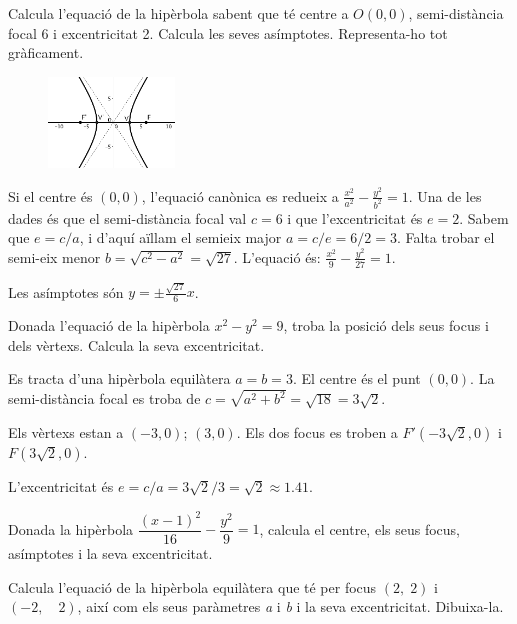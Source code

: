 \begin{resolt}[E]{Calcula l'equació de la hipèrbola sabent que té centre a $O(0,0)$, semi-distància focal 6 i excentricitat 2. Calcula les seves asímptotes. Representa-ho tot gràficament.}
  	\begin{figure} 
		\vspace{-0.5cm}
		\begin{center}
			\includegraphics[width=0.3\textwidth]{img-10/exem-h2.png}
		\end{center}
	\end{figure}

	Si el centre és $(0,0)$, l'equació canònica es redueix a \linebreak $\frac{x^2}{a^2}-\frac{y^2}{b^2}=1$. Una de les dades és que el semi-distància focal val $c=6$ i que l'excentricitat és $e=2$. Sabem que $e=c/a$, i d'aquí aïllam el semieix major  $a=c/e=6/2=3$. Falta trobar el semi-eix menor $b=\sqrt{c^2-a^2}=\sqrt{27}$. L'equació és: $\frac{x^2}{9}-\frac{y^2}{27}=1$.
	
	Les asímptotes són $y=\pm \frac{\sqrt{27}}{6}x$.
\end{resolt}
\begin{resolt}{ Donada l'equació de la hipèrbola  $x^2-y^2=9$, troba la posició dels seus focus i dels vèrtexs. Calcula la seva excentricitat. }
  
	Es tracta d'una hipèrbola equilàtera $a=b=3$. El centre és el punt $(0,0)$. La semi-distància focal es troba de $c=\sqrt{a^2+b^2}=\sqrt{18}=3\sqrt{2}$. 
	
	Els vèrtexs estan a $(-3,0)$; $(3,0)$. Els dos focus es troben a $F'(-3\sqrt{2},0)$ i $F(3\sqrt{2},0)$.  
	
	L'excentricitat és $e=c/a = 3\sqrt{2}/3 = \sqrt{2}\approx 1.41$.
\end{resolt}

\begin{mylist}
\exer[1] Donada la hipèrbola $\dfrac{\left(x-1\right)^{2}}{16} -\dfrac{{y}^{2}}{9} =1$, calcula el centre, els seus focus, asímptotes i la seva excentricitat.
	
\exer[1]  Calcula l'equació de la hipèrbola equilàtera que té per focus $\left(2,\; 2\right)$ i $\left(-2,\quad 2\right)$, així com els seus paràmetres \textit{a}  i  \textit{b} i la seva excentricitat. Dibuixa-la.

\end{mylist}
 
